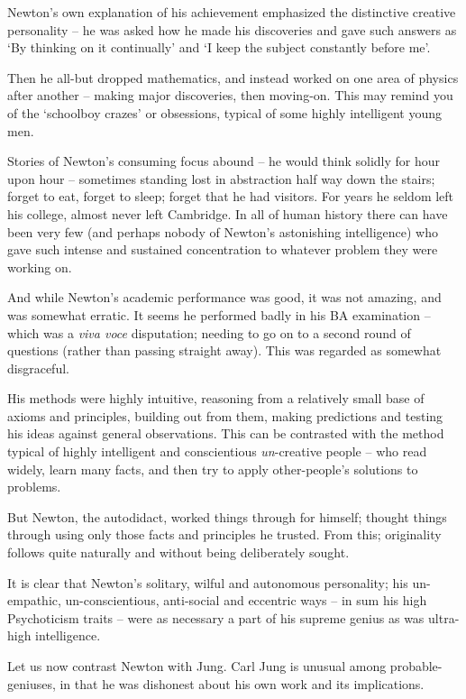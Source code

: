 \documentclass[
]{book}
\begin{document}
Newton's own explanation of his achievement emphasized the distinctive creative personality -- he was asked how he made his discoveries and gave such answers as `By thinking on it continually' and `I keep the subject constantly before me'.

Then he all-but dropped mathematics, and instead worked on one area of physics after another -- making major discoveries, then moving-on. This may remind you of the `schoolboy crazes' or obsessions, typical of some highly intelligent young men.

Stories of Newton's consuming focus abound -- he would think solidly for hour upon hour -- sometimes standing lost in abstraction half way down the stairs; forget to eat, forget to sleep; forget that he had visitors. For years he seldom left his college, almost never left Cambridge. In all of human history there can have been very few (and perhaps nobody of Newton's astonishing intelligence) who gave such intense and sustained concentration to whatever problem they were working on.

And while Newton's academic performance was good, it was not amazing, and was somewhat erratic. It seems he performed badly in his BA examination -- which was a \emph{viva voce} disputation; needing to go on to a second round of questions (rather than passing straight away). This was regarded as somewhat disgraceful.

His methods were highly intuitive, reasoning from a relatively small base of axioms and principles, building out from them, making predictions and testing his ideas against general observations. This can be contrasted with the method typical of highly intelligent and conscientious \emph{un}-creative people -- who read widely, learn many facts, and then try to apply other-people's solutions to problems.

But Newton, the autodidact, worked things through for himself; thought things through using only those facts and principles he trusted. From this; originality follows quite naturally and without being deliberately sought.

It is clear that Newton's solitary, wilful and autonomous personality; his un-empathic, un-conscientious, anti-social and eccentric ways -- in sum his high Psychoticism traits -- were as necessary a part of his supreme genius as was ultra-high intelligence.

Let us now contrast Newton with Jung. Carl Jung is unusual among probable-geniuses, in that he was dishonest about his own work and its implications.
\end{document}
